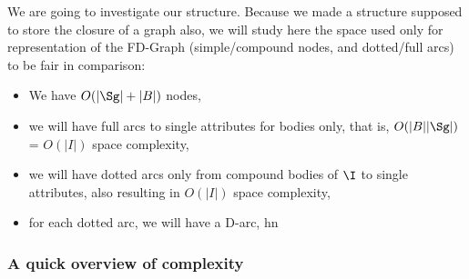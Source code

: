 \vspace{1.2em}

We are going to investigate our structure. Because we made a structure supposed
to store the closure of a graph also, we will study here the space used only
for representation of the FD-Graph (simple/compound nodes, and dotted/full 
arcs) to be fair in comparison:
\begin{itemize}
	\item We have $O(|\Sg| + |B|)$ nodes,
	\item we will have full arcs to single attributes for bodies only, 
	that is, $O(|B||\Sg|)$ = $O(|I|)$ space complexity,
	\item we will have dotted arcs only from compound bodies of $\I$ to 
	single attributes, also resulting in $O(|I|)$ space complexity,
	\item for each dotted arc, we will have a D-arc, hn
\end{itemize}

\subsubsection{A quick overview of complexity}





















